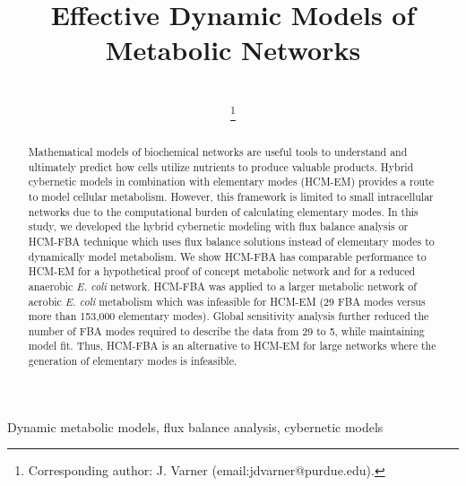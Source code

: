 \documentclass[10pt,twocolumn,twoside,final]{IEEEtran}
\begin{document}
\title{Effective Dynamic Models of Metabolic Networks}


\author{\\
\thanks{Corresponding author: J. Varner (email:jdvarner@purdue.edu).}}

\maketitle

\begin{abstract}
Mathematical models of biochemical networks are useful tools to understand and ultimately predict how cells utilize nutrients to produce valuable products.
Hybrid cybernetic models in combination with elementary modes (HCM-EM) provides a route to model cellular metabolism.
However, this framework is limited to small intracellular networks due to the computational burden of calculating elementary modes.
In this study, we developed the hybrid cybernetic modeling with flux balance analysis or HCM-FBA technique which uses flux balance solutions instead of elementary modes
to dynamically model metabolism.
We show HCM-FBA has comparable performance to HCM-EM for a hypothetical proof of concept metabolic network and for a reduced anaerobic \textit{E. coli} network.
HCM-FBA was applied to a larger metabolic network of aerobic \textit{E. coli} metabolism which was infeasible for HCM-EM (29 FBA modes versus more than 153,000 elementary modes).
Global sensitivity analysis further reduced the number of FBA modes required to describe the data from 29 to 5, while maintaining model fit.
Thus, HCM-FBA is an alternative to HCM-EM for large networks where the generation of elementary modes is infeasible.

\end{abstract}


\begin{IEEEkeywords}
Dynamic metabolic models, flux balance analysis, cybernetic models
\end{IEEEkeywords}
\end{document}
